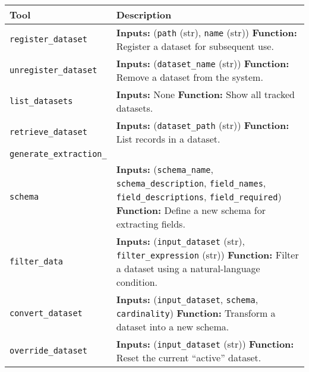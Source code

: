 \begin{table}[t]
\scriptsize
\centering
\label{tab:agent_tools_short}
\begin{tabular}{p{2.0cm}p{5.1cm}}
\toprule
\textbf{Tool} & \textbf{Description} \\
\midrule

\texttt{register\_dataset} 
& \textbf{Inputs:} (\texttt{path} (str), \texttt{name} (str)) 
\newline \textbf{Function:} Register a dataset for subsequent use. \\[5pt]

\texttt{unregister\_dataset}
& \textbf{Inputs:} (\texttt{dataset\_name} (str))
\newline \textbf{Function:} Remove a dataset from the system. \\[5pt]

\texttt{list\_datasets}
& \textbf{Inputs:} None  
\newline \textbf{Function:} Show all tracked datasets. \\[5pt]

\texttt{retrieve\_dataset}
& \textbf{Inputs:} (\texttt{dataset\_path} (str)) 
\newline \textbf{Function:} List records in a dataset. \\[5pt]

\texttt{generate\_extraction\_}\\ \texttt{schema}
& \textbf{Inputs:} (\texttt{schema\_name}, \texttt{schema\_description}, \texttt{field\_names}, \texttt{field\_descriptions}, \texttt{field\_required})
\newline \textbf{Function:} Define a new schema for extracting fields. \\[5pt]

\texttt{filter\_data}
& \textbf{Inputs:} (\texttt{input\_dataset} (str), \texttt{filter\_expression} (str))
\newline \textbf{Function:} Filter a dataset using a natural-language condition. \\[5pt]

\texttt{convert\_dataset}
& \textbf{Inputs:} (\texttt{input\_dataset}, \texttt{schema}, \texttt{cardinality})
\newline \textbf{Function:} Transform a dataset into a new schema. \\[5pt]

\texttt{override\_dataset}
& \textbf{Inputs:} (\texttt{input\_dataset} (str))
\newline \textbf{Function:} Reset the current “active” dataset. \\[5pt]


\end{tabular}
\end{table}
